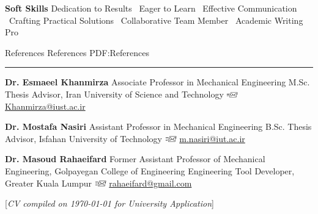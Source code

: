 \documentclass[letterpaper,MMMyyyy]{CVTemplate}
\newcommand{\CVNote}{CV compiled on {\today} for University Application}
\begin{document}
\begin{Body}
\vspace{6pt}
\BulletItem
\textbf{Soft Skills}
\newline
Dedication to Results 
\textbullet\ Eager to Learn 
\textbullet\ Effective Communication 
\textbullet\ Crafting Practical Solutions 
\textbullet\ Collaborative Team Member
\textbullet\ Academic Writing Pro

%
%



\Section
{References}
{References}
{PDF:References}
\textcolor{Forestg}{\vspace{0.10cm}\hrule height 0.1cm}\BigGap\Gap
\BulletItem
\textbf{Dr. Esmaeel Khanmirza}
\newline
Associate Professor in Mechanical Engineering
\newline
M.Sc. Thesis Advisor, Iran University of Science and Technology
\newline
\includegraphics[height=7pt]{icons/SendEmail.png} \href{mailto:Khanmirza@iust.ac.ir}{Khanmirza@iust.ac.ir}

\BigGap
\BulletItem
\textbf{Dr. Mostafa Nasiri}
\newline
Assistant Professor in Mechanical Engineering
\newline
B.Sc. Thesis Advisor, Isfahan University of Technology
\newline
\includegraphics[height=7pt]{icons/SendEmail.png} \href{mailto:m.nasiri@iut.ac.ir}{m.nasiri@iut.ac.ir}

\BigGap
\BulletItem
\textbf{Dr. Masoud Rahaeifard}
\newline
Former Assistant Professor of Mechanical Engineering, Golpayegan College of Engineering
\newline
Engineering Tool Developer, Greater Kuala Lumpur
\newline
\includegraphics[height=7pt]{icons/SendEmail.png} \href{mailto:rahaeifard@gmail.com}{rahaeifard@gmail.com}

\end{Body}


\UseNoteFont%
\hfill%
[\textit{\CVNote}]
\end{document}
